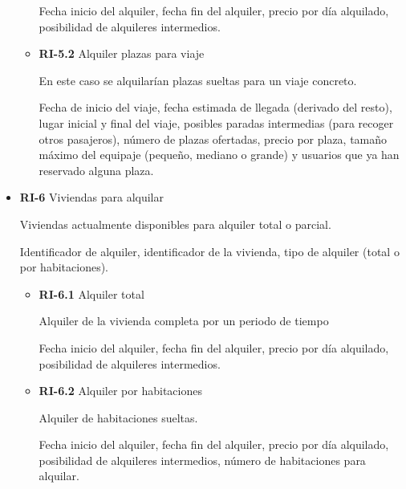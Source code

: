 \documentclass[11pt,spanish]{article} %
\begin{document}
\begin{itemize}
\begin{itemize}
		Fecha inicio del alquiler, fecha fin del alquiler, precio por día alquilado, posibilidad de alquileres intermedios.
		
		\item \textbf{RI-5.2} Alquiler plazas para viaje
		
		En este caso se alquilarían plazas sueltas para un viaje concreto.
		
		Fecha de inicio del viaje, fecha estimada de llegada (derivado del resto), lugar inicial y final del viaje, posibles paradas intermedias (para recoger otros pasajeros), número de plazas ofertadas, precio por plaza, tamaño máximo del equipaje (pequeño, mediano o grande) y usuarios que ya han reservado alguna plaza.
	\end{itemize}

	\item \textbf{RI-6} Viviendas para alquilar
	
	Viviendas actualmente disponibles para alquiler total o parcial.
	
	Identificador de alquiler, identificador de la vivienda, tipo de alquiler (total o por habitaciones). 
		
	\begin{itemize}
		\item \textbf{RI-6.1} Alquiler total
		
		Alquiler de la vivienda completa por un periodo de tiempo
		
		Fecha inicio del alquiler, fecha fin del alquiler, precio por día alquilado, posibilidad de alquileres intermedios.
		
		\item \textbf{RI-6.2} Alquiler por habitaciones
		
		Alquiler de habitaciones sueltas.
		
		Fecha inicio del alquiler, fecha fin del alquiler, precio por día alquilado, posibilidad de alquileres intermedios, número de habitaciones para alquilar.
	\end{itemize}

\end{itemize}
\end{document}
